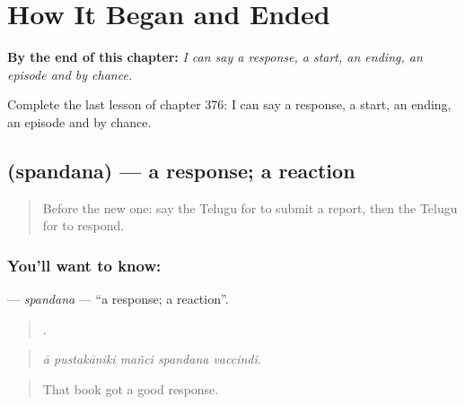 
\chapter{How It Began and Ended}
\label{ch:te-how-it-began-and-ended}

\begin{chapteropening}
\textbf{By the end of this chapter:} \emph{I can say a response, a start, an ending, an episode and by chance.}

Complete the last lesson of chapter 376: I can say a response, a start, an ending, an episode and by chance.
\end{chapteropening}

\section[\texorpdfstring{\te{స్పందన} (spandana)}{స్పందన (spandana)}]{ (spandana) — a response; a reaction}

\label{lesson:TE-C376-spandana}



\begin{quote}
Before the new one: say the Telugu for to submit a report, then the Telugu for to respond.
\end{quote}

\subsection*{You'll want to know: }
\textbf{} — \emph{spandana} — \textquotedblleft{}a response; a reaction\textquotedblright{}.

\begin{quote}
    .
\end{quote}

\begin{quote}
\emph{ā pustakāniki mañci spandana vaccindi.}
\end{quote}

\begin{quote}
That book got a good response.
\end{quote}

